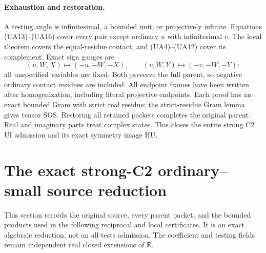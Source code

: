 \paragraph{Exhaustion and restoration.}
A testing angle is infinitesimal, a bounded unit, or projectively
infinite. Equations (UA13)--(UA16) cover every pair except ordinary
$u$ with infinitesimal $v$. The local theorem covers the equal-residue
contact, and (UA4)--(UA12) cover its complement. Exact sign gauges are
\[
 (u,W,X)\mapsto(-u,-W,-X),\qquad
 (v,W,Y)\mapsto(-v,-W,-Y);
\]
all unspecified variables are fixed. Both preserve the full parent,
so negative ordinary contact residues are included. All endpoint
frames have been written after homogenization, including literal
projective endpoints. Each proof has an exact bounded Gram with
strict real residue; the strict-residue Gram lemma gives tensor SOS.
Restoring all retained packets completes the original parent.
Real and imaginary parts treat complex states. This closes the
entire strong C2 UI admission and its exact symmetry image HU.



\section{\texorpdfstring{The exact strong-C2 ordinary--small source reduction}{The exact strong-C2 ordinary--small source reduction}}
\label{component:pc3daa35e9a9b}

\label{pc3daa35e9a9b:sec:ui-full-parent-reduction}

This section records the original source, every parent packet, and the
bounded products used in the following reciprocal and local certificates.
It is an exact algebraic reduction, not an all-tests admission. The
coefficient and testing fields remain independent real closed extensions
of $\mathbb R$.

